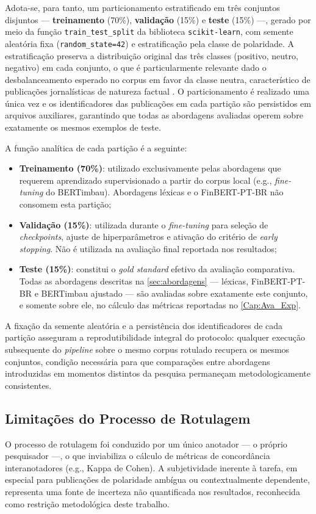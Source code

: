 Adota-se, para tanto, um particionamento estratificado em três conjuntos disjuntos --- \textbf{treinamento} (70\%), \textbf{validação} (15\%) e \textbf{teste} (15\%) ---, gerado por meio da função \texttt{train\_test\_split} da biblioteca \texttt{scikit-learn}, com semente aleatória fixa (\texttt{random\_state=42}) e estratificação pela classe de polaridade. A estratificação preserva a distribuição original das três classes (positivo, neutro, negativo) em cada conjunto, o que é particularmente relevante dado o desbalanceamento esperado no corpus em favor da classe neutra, característico de publicações jornalísticas de natureza factual \cite{loughran2011}. O particionamento é realizado uma única vez e os identificadores das publicações em cada partição são persistidos em arquivos auxiliares, garantindo que todas as abordagens avaliadas operem sobre exatamente os mesmos exemplos de teste.

A função analítica de cada partição é a seguinte:

\begin{itemize}
	\item \textbf{Treinamento (70\%)}: utilizado exclusivamente pelas abordagens que requerem aprendizado supervisionado a partir do corpus local (e.g., \textit{fine-tuning} do BERTimbau). Abordagens léxicas e o FinBERT-PT-BR não consomem esta partição;
	
	\item \textbf{Validação (15\%)}: utilizada durante o \textit{fine-tuning} para seleção de \textit{checkpoints}, ajuste de hiperparâmetros e ativação do critério de \textit{early stopping}. Não é utilizada na avaliação final reportada nos resultados;
	
	\item \textbf{Teste (15\%)}: constitui o \textit{gold standard} efetivo da avaliação comparativa. Todas as abordagens descritas na \autoref{sec:abordagens} --- léxicas, FinBERT-PT-BR e BERTimbau ajustado --- são avaliadas sobre exatamente este conjunto, e somente sobre ele, no cálculo das métricas reportadas no \autoref{Cap:Ava_Exp}.
\end{itemize}

A fixação da semente aleatória e a persistência dos identificadores de cada partição asseguram a reprodutibilidade integral do protocolo: qualquer execução subsequente do \textit{pipeline} sobre o mesmo corpus rotulado recupera os mesmos conjuntos, condição necessária para que comparações entre abordagens introduzidas em momentos distintos da pesquisa permaneçam metodologicamente consistentes.


\subsection{Limitações do Processo de Rotulagem}
\label{subsec:lim_rotulagem}

O processo de rotulagem foi conduzido por um único anotador — o próprio pesquisador —, o que inviabiliza o cálculo de métricas de concordância interanotadores (e.g., Kappa de Cohen). A subjetividade inerente à tarefa, em especial para publicações de polaridade ambígua ou contextualmente dependente, representa uma fonte de incerteza não quantificada nos resultados, reconhecida como restrição metodológica deste trabalho.
